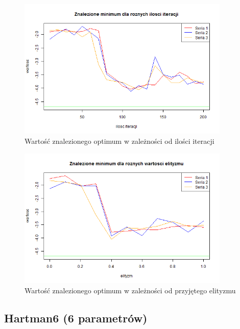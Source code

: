 \documentclass[11pt, a4paper]{article}
\begin{document}
\begin{figure}[H]
	\begin{center}
		\includegraphics[width=0.9\textwidth]{./assets/EMichalewicz5.png} %
		\caption{Wartość znalezionego optimum w zależności od ilości iteracji}
		\label{fig:emichalewicz5}
	\end{center}
\end{figure}

\begin{figure}[H]
	\begin{center}
		\includegraphics[width=0.9\textwidth]{./assets/EMichalewicz6.png} %
		\caption{Wartość znalezionego optimum w zależności od przyjętego elityzmu}
		\label{fig:emichalewicz6}
	\end{center}
\end{figure}

\newpage
\subsection{Hartman6 (6 parametrów)}
\end{document}
